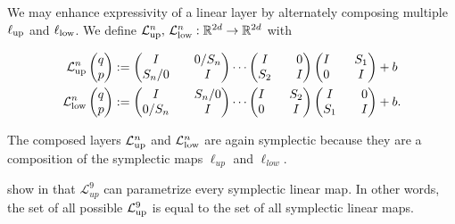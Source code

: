 \documentclass[twoside,a4paper]{article}
\begin{document}
We may enhance expressivity of a linear layer by alternately composing multiple
$\ell_{\text{up}}$ and $\ell_{\text{low}}$. We define 
$\mathcal{L}^{n}_{\text{up}},\, \mathcal{L}^{n}_{\text{low}} : \mathbb{R}^{2d} \to \mathbb{R}^{2d}$ with

\begin{align*}
	\mathcal{L}^{n}_{\text{up}} \begin{pmatrix} q \\ p \end{pmatrix} &:= \begin{pmatrix}
		I && 0 / S_n \\
		S_n / 0 && I
	\end{pmatrix}
	\cdots
	\begin{pmatrix}
		I && 0 \\
		S_2 && I
	\end{pmatrix}
	\begin{pmatrix}
		I && S_1 \\
		0 && I
	\end{pmatrix} + b \\
	\mathcal{L}^{n}_{\text{low}} \begin{pmatrix} q \\ p \end{pmatrix} &:= \begin{pmatrix}
		I && S_n / 0 \\
		0 / S_n && I
	\end{pmatrix}
	\cdots
	\begin{pmatrix}
		I && S_2 \\
		0 && I
	\end{pmatrix}
	\begin{pmatrix}
		I && 0 \\
		S_1 && I
	\end{pmatrix} + b
	.
\end{align*}

The composed layers
$\mathcal{L}^{n}_{\text{up}}$ and $\mathcal{L}^{n}_{\text{low}}$ are again symplectic because they 
are a composition of the symplectic maps $\ell_{up}$ and $\ell_{low}$.

\citeauthor{jin2020unit} show in \cite{jin2020unit} that $\mathcal{L}^{9}_{up}$
can parametrize every symplectic linear map. In other words, 
the set of all possible $\mathcal{L}^{9}_{\text{up}}$ is equal to the set of all symplectic linear maps.
\end{document}
